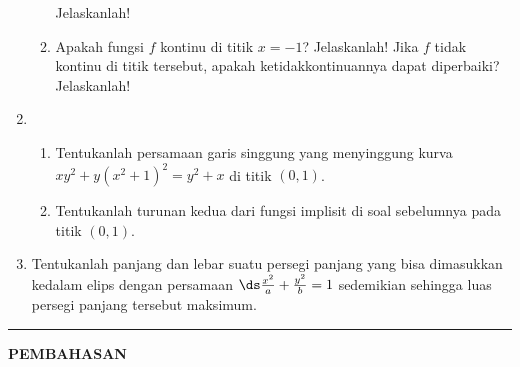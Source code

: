 \begin{enumerate}[leftmargin=*, label={\arabic*}.]
\begin{enumerate}[label={\alph*}.]
    Jelaskanlah! 
    \item Apakah fungsi $f$ kontinu di titik $x=-1$? Jelaskanlah! Jika $f$ tidak 
    kontinu di titik tersebut, apakah ketidakkontinuannya dapat diperbaiki? 
    Jelaskanlah! 
\end{enumerate}
\item 
\begin{enumerate}[label={\alph*}.]
    \item Tentukanlah persamaan garis singgung yang menyinggung kurva \\
    $xy^{2}+y(x^{2}+1)^{2} = y^{2}+x$ di titik $(0,1)$.
    \item Tentukanlah turunan kedua dari fungsi implisit di soal sebelumnya 
    pada titik $(0,1)$.
\end{enumerate}
\item Tentukanlah panjang dan lebar suatu persegi panjang yang bisa dimasukkan 
kedalam elips dengan persamaan $\ds \frac{x^{2}}{a}+\frac{y^{2}}{b}=1$ 
sedemikian sehingga luas persegi panjang tersebut maksimum.
\end{enumerate}
\vspace{0.2cm}
\hrule height 1pt
\vspace{0.5cm}
\begin{center}
    \textbf{\large{PEMBAHASAN}}
\end{center}

